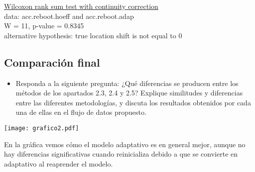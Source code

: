 \documentclass[11pt]{article}
\begin{document}
	\underline{Wilcoxon rank sum test with continuity correction}\\

data:  acc.reboot.hoeff and acc.reboot.adap\\
W = 11, p-value = 0.8345\\
alternative hypothesis: true location shift is not equal to 0\\

\subsection{Comparación final}
\label{sec:orgff9e531}

\begin{itemize}
\item Responda a la siguiente pregunta: ¿Qué diferencias se producen entre
los métodos de los apartados 2.3, 2.4 y 2.5? Explique similitudes y
diferencias entre las diferentes metodologías, y discuta los
resultados obtenidos por cada una de ellas en el flujo de datos
propuesto.
\end{itemize}

\begin{center}
\texttt{[image: grafico2.pdf]}
\end{center}


En la gráfica vemos cómo el modelo adaptativo es en general mejor,
aunque no hay diferencias significativas cuando reinicializa debido a
que se convierte en adaptativo al reaprender el modelo. 
\end{document}
